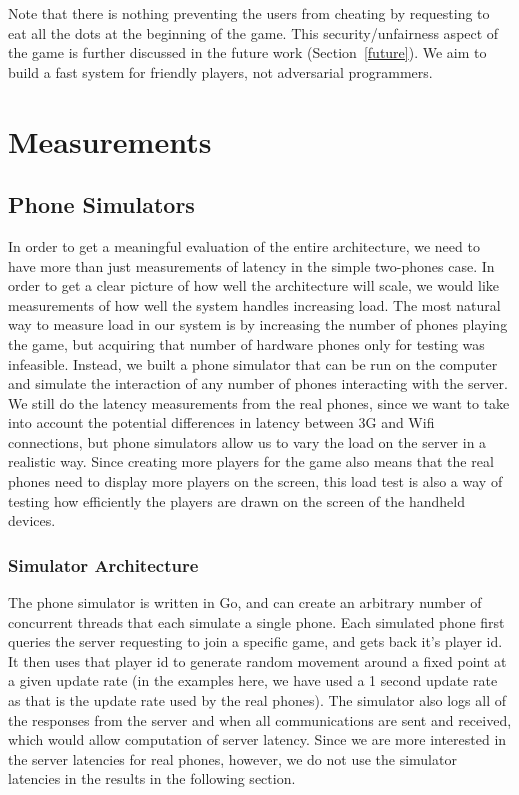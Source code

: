 \documentclass{acm_proc_article-sp}
\begin{document}
Note that there is nothing preventing the users from cheating by
requesting to eat all the dots at the beginning of the game. This
security/unfairness aspect of the game is further discussed in the
future work (Section~\ref{future}). We aim to build a fast system for
friendly players, not adversarial programmers.

\section{Measurements}
\subsection{Phone Simulators}
In order to get a meaningful evaluation of the entire architecture, we
need to have more than just measurements of latency in the simple
two-phones case.  In order to get a clear picture of how well the
architecture will scale, we would like measurements of how well the
system handles increasing load.  The most natural way to measure load
in our system is by increasing the number of phones playing the game,
but acquiring that number of hardware phones only for testing was
infeasible.  Instead, we built a phone simulator that can be run on
the computer and simulate the interaction of any number of phones
interacting with the server. We still do the latency measurements from
the real phones, since we want to take into account the potential
differences in latency between 3G and Wifi connections, but phone
simulators allow us to vary the load on the server in a realistic
way. Since creating more players for the game also means that the real
phones need to display more players on the screen, this load test is
also a way of testing how efficiently the players are drawn on the
screen of the handheld devices.

\subsubsection{Simulator Architecture}
The phone simulator is written in Go, and can create an arbitrary
number of concurrent threads that each simulate a single phone.  Each
simulated phone first queries the server requesting to join a specific
game, and gets back it's player id.  It then uses that player id to
generate random movement around a fixed point at a given update rate
(in the examples here, we have used a 1 second update rate as that is
the update rate used by the real phones). The simulator also logs all
of the responses from the server and when all communications are sent
and received, which would allow computation of server latency.  Since
we are more interested in the server latencies for real phones,
however, we do not use the simulator latencies in the results in the
following section.
\end{document}
